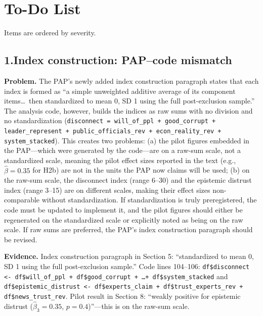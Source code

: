 \documentclass[11pt]{article}
\begin{document}
\section{To-Do List}

Items are ordered by severity.

\bigskip

\subsection*{1.\enspace Index construction: PAP--code mismatch}

\textbf{Problem.} The PAP's newly added index construction paragraph states that each index is formed as ``a simple unweighted additive average of its component items\ldots\ then standardized to mean 0, SD 1 using the full post-exclusion sample.'' The analysis code, however, builds the indices as raw sums with no division and no standardization (\texttt{disconnect = will\_of\_ppl + good\_corrupt + leader\_represent + public\_officials\_rev + econ\_reality\_rev + system\_stacked}). This creates two problems: (a) the pilot figures embedded in the PAP---which were generated by the code---are on a raw-sum scale, not a standardized scale, meaning the pilot effect sizes reported in the text (e.g., $\hat{\beta} = 0.35$ for H2b) are not in the units the PAP now claims will be used; (b) on the raw-sum scale, the disconnect index (range 6--30) and the epistemic distrust index (range 3--15) are on different scales, making their effect sizes non-comparable without standardization. If standardization is truly preregistered, the code must be updated to implement it, and the pilot figures should either be regenerated on the standardized scale or explicitly noted as being on the raw scale. If raw sums are preferred, the PAP's index construction paragraph should be revised.

\textbf{Evidence.} Index construction paragraph in Section 5: ``standardized to mean 0, SD 1 using the full post-exclusion sample.'' Code lines 104--106: \texttt{df\$disconnect <- df\$will\_of\_ppl + df\$good\_corrupt + \ldots + df\$system\_stacked} and \texttt{df\$epistemic\_distrust <- df\$experts\_claim + df\$trust\_experts\_rev + df\$news\_trust\_rev}. Pilot result in Section 8: ``weakly positive for epistemic distrust ($\hat{\beta}_3 = 0.35$, $p = 0.4$)''---this is on the raw-sum scale.
\end{document}
